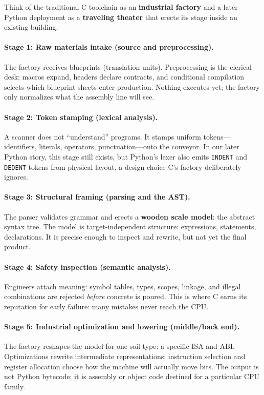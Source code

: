 \documentclass[a4paper,twoside]{report}
\begin{document}
Think of the traditional C toolchain as an \textbf{industrial factory} and a later Python deployment as a \textbf{traveling theater} that erects its stage inside an existing building.

\paragraph{Stage 1: Raw materials intake (source and preprocessing).}
The factory receives blueprints (translation units). Preprocessing is the clerical desk: macros expand, headers declare contracts, and conditional compilation selects which blueprint sheets enter production. Nothing executes yet; the factory only normalizes what the assembly line will see.

\paragraph{Stage 2: Token stamping (lexical analysis).}
A scanner does not ``understand'' programs. It stamps uniform tokens---identifiers, literals, operators, punctuation---onto the conveyor. In our later Python story, this stage still exists, but Python's lexer also emits \texttt{INDENT} and \texttt{DEDENT} tokens from physical layout, a design choice C's factory deliberately ignores.

\paragraph{Stage 3: Structural framing (parsing and the AST).}
The parser validates grammar and erects a \textbf{wooden scale model}: the abstract syntax tree. The model is target-independent structure: expressions, statements, declarations. It is precise enough to inspect and rewrite, but not yet the final product.

\paragraph{Stage 4: Safety inspection (semantic analysis).}
Engineers attach meaning: symbol tables, types, scopes, linkage, and illegal combinations are rejected \emph{before} concrete is poured. This is where C earns its reputation for early failure: many mistakes never reach the CPU.

\paragraph{Stage 5: Industrial optimization and lowering (middle/back end).}
The factory reshapes the model for one soil type: a specific ISA and ABI. Optimizations rewrite intermediate representations; instruction selection and register allocation choose how the machine will actually move bits. The output is not Python bytecode; it is assembly or object code destined for a particular CPU family.
\end{document}
